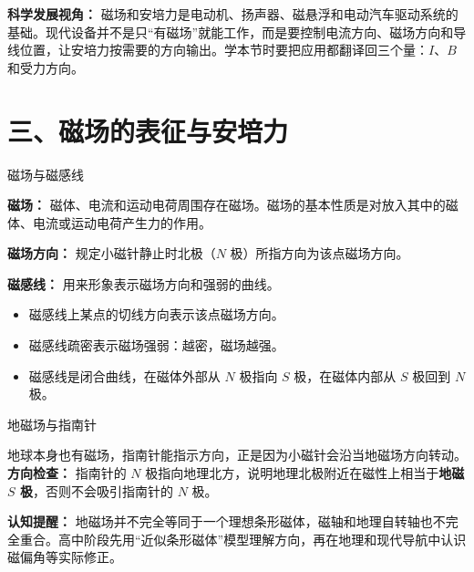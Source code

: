 \textbf{科学发展视角：} 磁场和安培力是电动机、扬声器、磁悬浮和电动汽车驱动系统的基础。现代设备并不是只“有磁场”就能工作，而是要控制电流方向、磁场方向和导线位置，让安培力按需要的方向输出。学本节时要把应用都翻译回三个量：$I$、$B$ 和受力方向。

\section*{三、磁场的表征与安培力}

\begin{conceptbox}{磁场与磁感线}

\textbf{磁场：} 磁体、电流和运动电荷周围存在磁场。磁场的基本性质是对放入其中的磁体、电流或运动电荷产生力的作用。

\textbf{磁场方向：} 规定小磁针静止时北极（$N$ 极）所指方向为该点磁场方向。

\textbf{磁感线：} 用来形象表示磁场方向和强弱的曲线。
\begin{itemize}
  \item 磁感线上某点的切线方向表示该点磁场方向。
  \item 磁感线疏密表示磁场强弱：越密，磁场越强。
  \item 磁感线是闭合曲线，在磁体外部从 $N$ 极指向 $S$ 极，在磁体内部从 $S$ 极回到 $N$ 极。
\end{itemize}

\begin{center}


\label{fig:magnetic-field-lines}
\end{center}

\end{conceptbox}

\begin{conceptbox}{地磁场与指南针}

地球本身也有磁场，指南针能指示方向，正是因为小磁针会沿当地磁场方向转动。\textbf{方向检查：} 指南针的 $N$ 极指向地理北方，说明地理北极附近在磁性上相当于\textbf{地磁 $S$ 极}，否则不会吸引指南针的 $N$ 极。

\begin{center}


\label{fig:earth-magnetic-field}
\end{center}

\textbf{认知提醒：} 地磁场并不完全等同于一个理想条形磁体，磁轴和地理自转轴也不完全重合。高中阶段先用“近似条形磁体”模型理解方向，再在地理和现代导航中认识磁偏角等实际修正。

\end{conceptbox}

